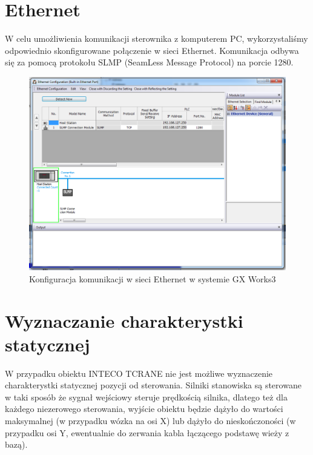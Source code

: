 \section{Ethernet}
\label{PLC::Konfiguracja::Ethernet}
W celu umożliwienia komunikacji sterownika z komputerem PC, wykorzystaliśmy odpowiednio 
skonfigurowane
połączenie w sieci Ethernet. Komunikacja odbywa się za pomocą protokołu SLMP (SeamLess 
Message Protocol) na porcie 1280. 

\begin{figure}[H]
    \label{PLC::Konfiguracja::Ethernet::Window}
    \centering
    \includegraphics[scale=0.3]{./sections/inteco/images/ethernet.png}
    \caption{Konfiguracja komunikacji w sieci Ethernet w systemie GX Works3}
\end{figure}

\section{Wyznaczanie charakterystki statycznej}
\label{inteco_char_stat}

W przypadku obiektu INTECO TCRANE nie jest możliwe wyznaczenie charakterystki 
statycznej pozycji od sterowania. Silniki stanowiska są sterowane w taki sposób
że sygnał wejściowy steruje prędkością silnika, dlatego też dla każdego niezerowego
sterowania, wyjście obiektu będzie dążyło do wartości maksymalnej (w przypadku wózka
na osi X) lub dążyło do nieskończoności (w przypadku osi Y, ewentualnie do zerwania 
kabla łączącego podstawę wieży z bazą).